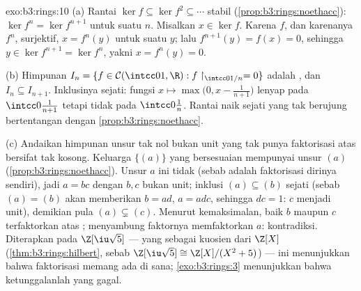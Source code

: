 \begin{solution}{exo:b3:rings:10}
(a) Rantai $\ker f \subseteq \ker f^2 \subseteq \cdots$
stabil (\cref{prop:b3:rings:noethacc}): $\ker f^n = \ker
f^{n+1}$ untuk suatu $n$. Misalkan $x \in \ker f$. Karena $f$, dan karenanya $f^n$,
surjektif, $x = f^n(y)$ untuk suatu $y$; lalu $f^{n+1}(y) = f(x) =
0$, sehingga $y \in \ker f^{n+1} = \ker f^n$, yakni $x = f^n(y) = 0$.

(b) Himpunan $I_n = \{f \in \mathcal C(\intcc01, \R) : f\restriction_{
\intcc0{1/n}} = 0\}$ adalah , dan $I_n \subseteq I_{n+1}$.
Inklusinya sejati: fungsi $x \mapsto \max\bigl(0, x -
\frac1{n+1}\bigr)$ lenyap pada $\intcc0{\frac1{n+1}}$ tetapi tidak pada
$\intcc0{\frac1n}$. Rantai naik sejati yang tak berujung
bertentangan dengan \cref{prop:b3:rings:noethacc}.

(c) Andaikan himpunan unsur tak nol bukan unit yang tak punya faktorisasi
atas  bersifat tak kosong. Keluarga 
$\{(a)\}$ yang bersesuaian mempunyai unsur  $(a)$
(\cref{prop:b3:rings:noethacc}). Unsur $a$ ini tidak
 (sebab  adalah faktorisasi dirinya sendiri), jadi $a = bc$
dengan $b, c$ bukan unit; inklusi $(a) \subseteq (b)$ sejati (sebab $(a) =
(b)$ akan memberikan $b = ad$, $a = adc$, sehingga $dc = 1$: $c$ menjadi unit),
demikian pula $(a) \subsetneq (c)$. Menurut kemaksimalan, baik $b$ maupun $c$
terfaktorkan atas ; menyambung faktornya memfaktorkan $a$:
kontradiksi. Diterapkan pada $\Z[\iu\sqrt5]$ --- yang  sebagai
kuosien dari $\Z[X]$ (\cref{thm:b3:rings:hilbert}, sebab $\Z[\iu\sqrt5]
\cong \Z[X]/(X^2+5)$) --- ini menunjukkan bahwa faktorisasi memang ada di sana;
\cref{exo:b3:rings:3} menunjukkan bahwa ketunggalanlah yang gagal.
\end{solution}

